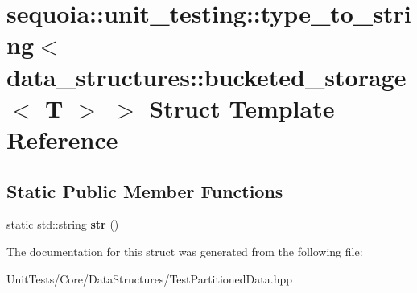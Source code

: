 \hypertarget{structsequoia_1_1unit__testing_1_1type__to__string_3_01data__structures_1_1bucketed__storage_3_01_t_01_4_01_4}{}\section{sequoia\+::unit\+\_\+testing\+::type\+\_\+to\+\_\+string$<$ data\+\_\+structures\+::bucketed\+\_\+storage$<$ T $>$ $>$ Struct Template Reference}
\label{structsequoia_1_1unit__testing_1_1type__to__string_3_01data__structures_1_1bucketed__storage_3_01_t_01_4_01_4}
\subsection*{Static Public Member Functions}
\begin{DoxyCompactItemize}
\item 
\mbox{\label{structsequoia_1_1unit__testing_1_1type__to__string_3_01data__structures_1_1bucketed__storage_3_01_t_01_4_01_4_a8174d636e3e3a43161dd79e29a70f96e}} 
static std\+::string {\bfseries str} ()
\end{DoxyCompactItemize}


The documentation for this struct was generated from the following file\+:\begin{DoxyCompactItemize}
\item 
Unit\+Tests/\+Core/\+Data\+Structures/Test\+Partitioned\+Data.\+hpp\end{DoxyCompactItemize}
